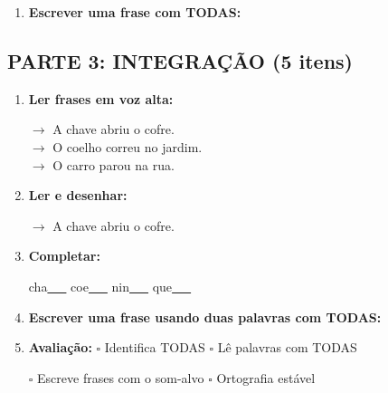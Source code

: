 \begin{exercicio}
\begin{enumerate}[resume]
  \item \textbf{Escrever uma frase com TODAS:}
  \begin{center}
  \underline{\hspace{12cm}}
  \end{center}

\end{enumerate}

\subsection*{PARTE 3: INTEGRAÇÃO (5 itens)}

\begin{enumerate}[resume]

  \item \textbf{Ler frases em voz alta:}
  \begin{center}
  $\rightarrow$ A chave abriu o cofre.\\
  $\rightarrow$ O coelho correu no jardim.\\
  $\rightarrow$ O carro parou na rua.\\
  \end{center}

  \item \textbf{Ler e desenhar:}
  \begin{center}
  $\rightarrow$ A chave abriu o cofre.
  \end{center}
  \begin{center}
  \end{center}

  \item \textbf{Completar:}
  \begin{center}
  cha\underline{~~~} \quad coe\underline{~~~} \quad nin\underline{~~~} \quad que\underline{~~~}
  \end{center}

  \item \textbf{Escrever uma frase usando duas palavras com TODAS:}
  \begin{center}
  \underline{\hspace{12cm}}
  \end{center}

  \item \textbf{Avaliação:} $\square$ Identifica TODAS \quad $\square$ Lê palavras com TODAS
  \begin{center}
  $\square$ Escreve frases com o som-alvo \quad $\square$ Ortografia estável
  \end{center}


\end{enumerate}
\end{exercicio}
